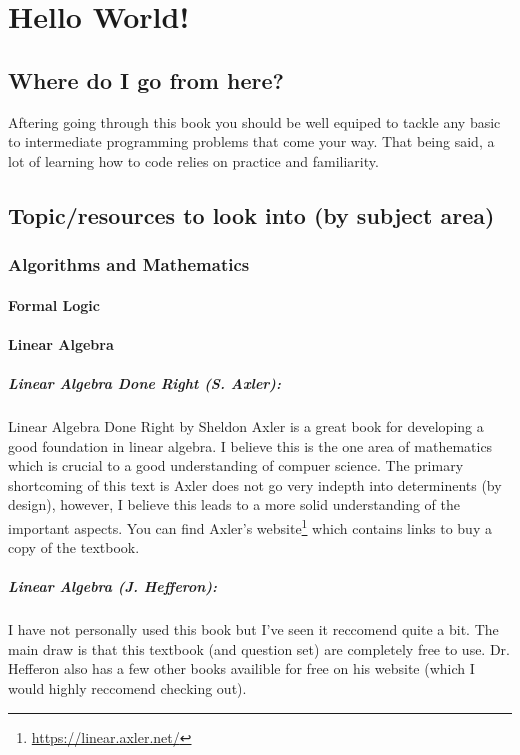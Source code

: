 \documentclass[12pt,a4paper]{book}
\begin{document}
	\chapter{Hello World!} \label{chap:hello-world}
		\section{Where do I go from here?}
			Aftering going through this book you should be well equiped to tackle any basic to intermediate programming problems that come your way. That being said, a lot of learning how to code relies on practice and familiarity. 
		\section{Topic/resources to look into (by subject area)}
			\subsection{Algorithms and Mathematics}
				\subsubsection{Formal Logic}
				
				\subsubsection{Linear Algebra}
					\paragraph{Linear Algebra Done Right (S. Axler):} 
						Linear Algebra Done Right by Sheldon Axler is a great book for developing a good foundation in linear algebra. I believe this is the one area of mathematics which is crucial to a good understanding of compuer science. The primary shortcoming of this text is Axler does not go very indepth into determinents (by design), however, I believe this leads to a more solid understanding of the important aspects. You can find Axler's website\footnote{\href{https://linear.axler.net/}{https://linear.axler.net/}} which contains links to buy a copy of the textbook.

					\paragraph{Linear Algebra (J. Hefferon):} 
						I have not personally used this book but I've seen it reccomend quite a bit. The main draw is that this textbook (and question set) are completely free to use. Dr. Hefferon also has a few other books availible for free on his website (which I would highly reccomend checking out).
					
\end{document}
